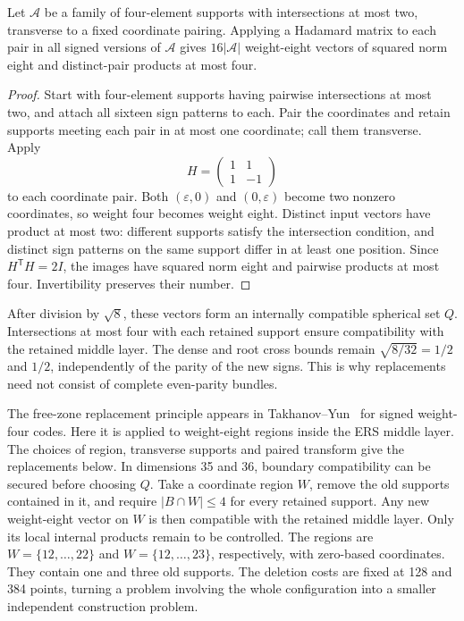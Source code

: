 \begin{proposition}
\label{prop:hadamard}
Let $\mathcal A$ be a family of four-element supports with intersections
at most two, transverse to a fixed coordinate pairing. Applying a
Hadamard matrix to each pair in all signed versions of $\mathcal A$
gives $16|\mathcal A|$ weight-eight vectors of squared norm eight and
distinct-pair products at most four.
\end{proposition}
\begin{proof}
Start with four-element supports having pairwise intersections at most
two, and attach all sixteen sign patterns to each. Pair the coordinates
and retain supports meeting each pair in at most one coordinate; call them
transverse. Apply
\[
H=\begin{pmatrix}1&1\\1&-1\end{pmatrix}
\]
to each coordinate pair. Both $(\varepsilon,0)$ and $(0,\varepsilon)$
become two nonzero coordinates, so weight four becomes weight eight.
Distinct input vectors have product at most two: different supports
satisfy the intersection condition, and distinct sign patterns on the same
support differ in at least one position. Since $H^{\mathsf T}H=2I$,
the images have squared norm eight and pairwise products at most four.
Invertibility preserves their number.
\end{proof}

After division by $\sqrt8$, these vectors form an internally compatible
spherical set $Q$. Intersections at most four with each retained support
ensure compatibility with the retained middle layer. The dense and root
cross bounds remain $\sqrt{8/32}=1/2$ and $1/2$, independently of the
parity of the new signs. This is why replacements need not consist of
complete even-parity bundles.

The free-zone replacement principle appears in
Takhanov--Yun~\cite[Section V, Definition 5 and Lemma 4]{signed-johnson}
for signed weight-four codes. Here it is applied to weight-eight
regions inside the ERS middle layer. The choices of region, transverse
supports and paired transform give the replacements below.
In dimensions 35 and 36, boundary compatibility can be secured before
choosing $Q$. Take a coordinate region $W$, remove the old supports
contained in it, and require $|B\cap W|\le4$ for every retained support.
Any new weight-eight vector on $W$ is then compatible with the retained
middle layer. Only its local internal products remain to be controlled.
The regions are $W=\{12,\ldots,22\}$ and $W=\{12,\ldots,23\}$,
respectively, with zero-based coordinates. They contain one and three
old supports. The deletion costs are fixed at 128 and 384 points,
turning a problem involving the whole configuration into a smaller
independent construction problem.

